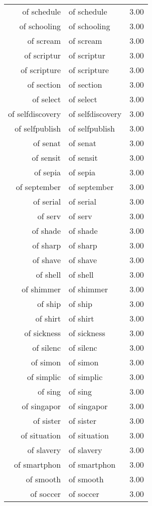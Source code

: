\begin{table}[ht]
\begin{tabular}{rlr}
  of schedule & of schedule & 3.00 \\ 
  of schooling & of schooling & 3.00 \\ 
  of scream & of scream & 3.00 \\ 
  of scriptur & of scriptur & 3.00 \\ 
  of scripture & of scripture & 3.00 \\ 
  of section & of section & 3.00 \\ 
  of select & of select & 3.00 \\ 
  of selfdiscovery & of selfdiscovery & 3.00 \\ 
  of selfpublish & of selfpublish & 3.00 \\ 
  of senat & of senat & 3.00 \\ 
  of sensit & of sensit & 3.00 \\ 
  of sepia & of sepia & 3.00 \\ 
  of september & of september & 3.00 \\ 
  of serial & of serial & 3.00 \\ 
  of serv & of serv & 3.00 \\ 
  of shade & of shade & 3.00 \\ 
  of sharp & of sharp & 3.00 \\ 
  of shave & of shave & 3.00 \\ 
  of shell & of shell & 3.00 \\ 
  of shimmer & of shimmer & 3.00 \\ 
  of ship & of ship & 3.00 \\ 
  of shirt & of shirt & 3.00 \\ 
  of sickness & of sickness & 3.00 \\ 
  of silenc & of silenc & 3.00 \\ 
  of simon & of simon & 3.00 \\ 
  of simplic & of simplic & 3.00 \\ 
  of sing & of sing & 3.00 \\ 
  of singapor & of singapor & 3.00 \\ 
  of sister & of sister & 3.00 \\ 
  of situation & of situation & 3.00 \\ 
  of slavery & of slavery & 3.00 \\ 
  of smartphon & of smartphon & 3.00 \\ 
  of smooth & of smooth & 3.00 \\ 
  of soccer & of soccer & 3.00 \\ 

\end{tabular}
\end{table}
